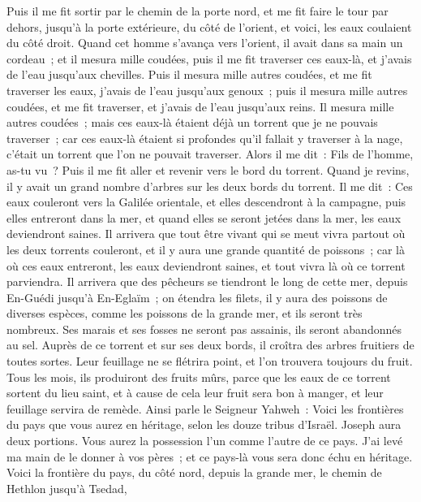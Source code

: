 \begin{multicols}{2}
Puis il me fit sortir par le chemin de la porte nord, et me fit faire le tour par dehors, jusqu'à la porte extérieure, du côté de l'orient, et voici, les eaux coulaient du côté droit.
Quand cet homme s'avança vers l'orient, il avait dans sa main un cordeau~; et il mesura mille coudées, puis il me fit traverser ces eaux-là, et j'avais de l'eau jusqu'aux chevilles.
Puis il mesura mille autres coudées, et me fit traverser les eaux, j'avais de l'eau jusqu'aux genoux~; puis il mesura mille autres coudées, et me fit traverser, et j'avais de l'eau jusqu'aux reins.
Il mesura mille autres coudées~; mais ces eaux-là étaient déjà un torrent que je ne pouvais traverser~; car ces eaux-là étaient si profondes qu'il fallait y traverser à la nage, c'était un torrent que l'on ne pouvait traverser.
Alors il me dit~: Fils de l'homme, as-tu vu~? Puis il me fit aller et revenir vers le bord du torrent.
Quand je revins, il y avait un grand nombre d'arbres sur les deux bords du torrent.
Il me dit~: Ces eaux couleront vers la Galilée orientale, et elles descendront à la campagne, puis elles entreront dans la mer, et quand elles se seront jetées dans la mer, les eaux deviendront saines.
Il arrivera que tout être vivant qui se meut vivra partout où les deux torrents couleront, et il y aura une grande quantité de poissons~; car là où ces eaux entreront, les eaux deviendront saines, et tout vivra là où ce torrent parviendra.
Il arrivera que des pêcheurs se tiendront le long de cette mer, depuis En-Guédi jusqu'à En-Eglaïm~; on étendra les filets, il y aura des poissons de diverses espèces, comme les poissons de la grande mer, et ils seront très nombreux.
Ses marais et ses fosses ne seront pas assainis, ils seront abandonnés au sel.
Auprès de ce torrent et sur ses deux bords, il croîtra des arbres fruitiers de toutes sortes. Leur feuillage ne se flétrira point, et l'on trouvera toujours du fruit. Tous les mois, ils produiront des fruits mûrs, parce que les eaux de ce torrent sortent du lieu saint, et à cause de cela leur fruit sera bon à manger, et leur feuillage servira de remède.
Ainsi parle le Seigneur Yahweh~: Voici les frontières du pays que vous aurez en héritage, selon les douze tribus d'Israël. Joseph aura deux portions.
Vous aurez la possession l'un comme l'autre de ce pays. J'ai levé ma main de le donner à vos pères~; et ce pays-là vous sera donc échu en héritage.
Voici la frontière du pays, du côté nord, depuis la grande mer, le chemin de Hethlon jusqu'à Tsedad,

\end{multicols}
